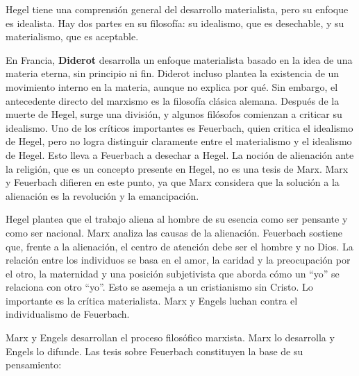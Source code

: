 \documentclass[
  jou,
  floatsintext,
  longtable,
  a4paper,
  nolmodern,
  notxfonts,
  notimes,
  12pt,
  colorlinks=true,linkcolor=blue,citecolor=blue,urlcolor=blue]{apa7}
\begin{document}
Hegel tiene una comprensión general del desarrollo materialista, pero su
enfoque es idealista. Hay dos partes en su filosofía: su idealismo, que
es desechable, y su materialismo, que es aceptable.

En Francia, \textbf{Diderot} desarrolla un enfoque materialista basado
en la idea de una materia eterna, sin principio ni fin. Diderot incluso
plantea la existencia de un movimiento interno en la materia, aunque no
explica por qué. Sin embargo, el antecedente directo del marxismo es la
filosofía clásica alemana. Después de la muerte de Hegel, surge una
división, y algunos filósofos comienzan a criticar su idealismo. Uno de
los críticos importantes es Feuerbach, quien critica el idealismo de
Hegel, pero no logra distinguir claramente entre el materialismo y el
idealismo de Hegel. Esto lleva a Feuerbach a desechar a Hegel. La noción
de alienación ante la religión, que es un concepto presente en Hegel, no
es una tesis de Marx. Marx y Feuerbach difieren en este punto, ya que
Marx considera que la solución a la alienación es la revolución y la
emancipación.

Hegel plantea que el trabajo aliena al hombre de su esencia como ser
pensante y como ser nacional. Marx analiza las causas de la alienación.
Feuerbach sostiene que, frente a la alienación, el centro de atención
debe ser el hombre y no Dios. La relación entre los individuos se basa
en el amor, la caridad y la preocupación por el otro, la maternidad y
una posición subjetivista que aborda cómo un ``yo'' se relaciona con
otro ``yo''. Esto se asemeja a un cristianismo sin Cristo. Lo importante
es la crítica materialista. Marx y Engels luchan contra el
individualismo de Feuerbach.

Marx y Engels desarrollan el proceso filosófico marxista. Marx lo
desarrolla y Engels lo difunde. Las tesis sobre Feuerbach constituyen la
base de su pensamiento:
\end{document}
